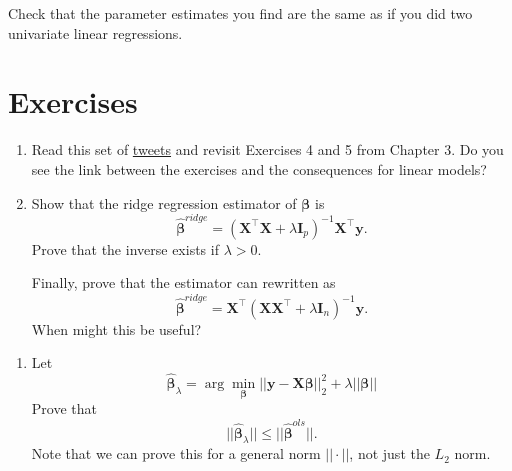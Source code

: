 \documentclass[
]{book}
\providecommand{\tightlist}{%
  \setlength{\itemsep}{0pt}\setlength{\parskip}{0pt}}
\theoremstyle{definition}
\theoremstyle{definition}
\theoremstyle{definition}
\theoremstyle{definition}
\theoremstyle{remark}
\begin{document}
Check that the parameter estimates you find are the same as if you did two univariate linear regressions.

\hypertarget{exercises-7}{%
\section{Exercises}\label{exercises-7}}

\begin{enumerate}
\def\labelenumi{\arabic{enumi}.}
\setcounter{enumi}{-1}
\item
  Read this set of \href{https://twitter.com/docmilanfar/status/1763454849864413193}{tweets} and revisit Exercises 4 and 5 from Chapter 3. Do you see the link between the exercises and the consequences for linear models?
\item
  Show that the ridge regression estimator of \(\boldsymbol \beta\) is
  \[\hat{\boldsymbol \beta}^{ridge} = (\mathbf X^\top \mathbf X+ \lambda\mathbf I_p)^{-1}\mathbf X^\top \mathbf y.\]
  Prove that the inverse exists if \(\lambda > 0\).

  Finally, prove that the estimator can rewritten as
  \[\hat{\boldsymbol \beta}^{ridge} = \mathbf X^\top(\mathbf X\mathbf X^\top + \lambda\mathbf I_n)^{-1} \mathbf y.\]
  When might this be useful?
\end{enumerate}

\begin{enumerate}
\def\labelenumi{\arabic{enumi}.}
\setcounter{enumi}{1}
\tightlist
\item
  Let
  \[\hat{\boldsymbol \beta}_\lambda=\arg \min_{\boldsymbol \beta} ||\mathbf y-\mathbf X\boldsymbol \beta||_2^2+\lambda ||\boldsymbol \beta||\]
  Prove that \[||\hat{\boldsymbol \beta}_\lambda|| \leq ||\hat{\boldsymbol \beta}^{ols}||.\]
  Note that we can prove this for a general norm \(||\cdot||\), not just the \(L_2\) norm.
\end{enumerate}
\end{document}
